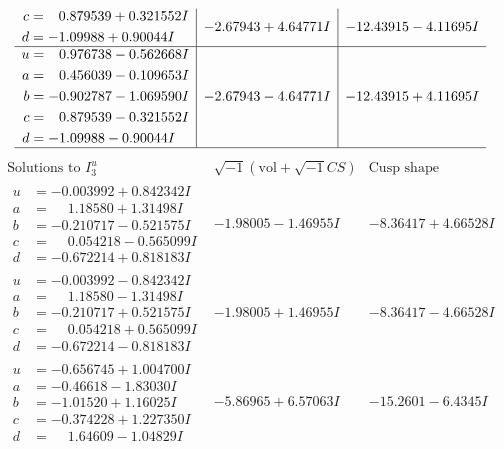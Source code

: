 \documentclass[1p]{elsarticle_modified}
\theoremstyle{definition}
\newcommand{\I}{\sqrt{-1}}
\begin{document}
$$\begin{array}{c|c|c}
\begin{aligned}
c &= \phantom{-}0.879539 + 0.321552 I \\
d &= -1.09988 + 0.90044 I\end{aligned}
 & -2.67943 + 4.64771 I & -12.43915 - 4.11695 I \\ \hline\begin{aligned}
u &= \phantom{-}0.976738 - 0.562668 I \\
a &= \phantom{-}0.456039 - 0.109653 I \\
b &= -0.902787 - 1.069590 I \\
c &= \phantom{-}0.879539 - 0.321552 I \\
d &= -1.09988 - 0.90044 I\end{aligned}
 & -2.67943 - 4.64771 I & -12.43915 + 4.11695 I\\
 \hline 
 \end{array}$$\newpage$$\begin{array}{c|c|c}  
\text{Solutions to }I^u_{3}& \I (\text{vol} + \sqrt{-1}CS) & \text{Cusp shape}\\
 \hline 
\begin{aligned}
u &= -0.003992 + 0.842342 I \\
a &= \phantom{-}1.18580 + 1.31498 I \\
b &= -0.210717 - 0.521575 I \\
c &= \phantom{-}0.054218 - 0.565099 I \\
d &= -0.672214 + 0.818183 I\end{aligned}
 & -1.98005 - 1.46955 I & -8.36417 + 4.66528 I \\ \hline\begin{aligned}
u &= -0.003992 - 0.842342 I \\
a &= \phantom{-}1.18580 - 1.31498 I \\
b &= -0.210717 + 0.521575 I \\
c &= \phantom{-}0.054218 + 0.565099 I \\
d &= -0.672214 - 0.818183 I\end{aligned}
 & -1.98005 + 1.46955 I & -8.36417 - 4.66528 I \\ \hline\begin{aligned}
u &= -0.656745 + 1.004700 I \\
a &= -0.46618 - 1.83030 I \\
b &= -1.01520 + 1.16025 I \\
c &= -0.374228 + 1.227350 I \\
d &= \phantom{-}1.64609 - 1.04829 I\end{aligned}
 & -5.86965 + 6.57063 I & -15.2601 - 6.4345 I \\ \hline\begin{aligned}

\end{aligned}
\end{array}$$
\end{document}
